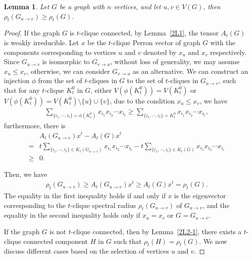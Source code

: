\documentclass[preprint,12pt]{elsarticle}
\newtheorem{lem}[thm]{Lemma}
\begin{document}
        \begin{lem}\label{CL1}
                Let $G$ be a graph with $n$ vertices, and let $u,v \in V(G)$, then $\rho_t(G_{u \to v}) \geq \rho_t(G)$.
        \end{lem}
        \begin{proof}
                If the graph $G$ is $t$-clique connected, by Lemma~\ref{2L1}, the tensor $A_t(G)$ is weakly irreducible. Let $x$ be the $t$-clique Perron vector of graph $G$ with the components corresponding to vertices $u$ and $v$ denoted by $x_u$ and $x_v$ respectively. Since $G_{u \to v}$ is isomorphic to $G_{v \to u}$, without loss of generality, we may assume $x_u \leq x_v$, otherwise, we can consider $G_{v \to u}$ as an alternative. We can construct an injection $\phi$ from the set of $t$-cliques in $G$ to the set of $t$-cliques in $G_{u\to v}$, such that for any $t$-clique $K_t^0$ in $G$, either $V(\phi(K_t^0))=V(K_t^0)$ or $V(\phi(K_t^0)) = V(K_t^0)\setminus \{u\} \cup \{v\}$, due to the condition $x_u \leq x_v$, we have
                    \begin{align*}
                        \sum_{\{i_1,\cdots ,i_t\} = \phi(K_t^0)}x_{i_1}x_{i_2}\cdots x_{i_t} \geq \sum_{\{i_1,\cdots ,i_t\}=  K_t^0}x_{i_1}x_{i_2}\cdots x_{i_t},
			        \end{align*}
                furthermore, there is
                    \begin{align*}
                         &A_t(G_{u\to v})x^t - A_t(G)x^t\\
                         = & t\sum_{\{i_1,\cdots ,i_t\}\in K_t(G_{u\to v})}x_{i_1}x_{i_2}\cdots x_{i_t}-t\sum_{\{i_1,\cdots ,i_t\}\in K_t(G)}x_{i_1}x_{i_2}\cdots x_{i_t}\\
                         \geq & 0.
			        \end{align*}

                Then, we have
                    \begin{align}\label{align1}
                         \rho_t(G_{u\to v}) \geq {A_t(G_{u\to v})x^t} \geq {A_t(G)x^t}= \rho_t(G).
			        \end{align}
                The equality in the first inequality holds if and only if $x$ is the eigenvector corresponding to the $t$-clique spectral radius $\rho_t(G_{u\to v})$ of $G_{u\to v}$, and the equality in the second inequality holds only if $x_u = x_v$ or $G = G_{u \to v}$.


                If the graph $G$ is not $t$-clique connected, then by Lemma~\ref{2L2-1}, there exists a $t$-clique connected component $H$ in $G$ such that $\rho_t(H) = \rho_t(G)$. We now discuss different cases based on the selection of vertices $u$ and $v$.


\end{proof}
\end{document}
